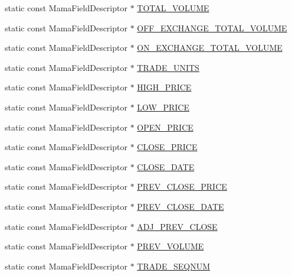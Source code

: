 \begin{CompactItemize}
\item 
static const Mama\-Field\-Descriptor $\ast$ \hyperlink{classWombat_1_1MamdaTradeFields_dccfc4d9e121e80325dc8e348e717c10}{TOTAL\_\-VOLUME}
\item 
static const Mama\-Field\-Descriptor $\ast$ \hyperlink{classWombat_1_1MamdaTradeFields_aea6105e2943749ac8bdd0f9b32dfb3e}{OFF\_\-EXCHANGE\_\-TOTAL\_\-VOLUME}
\item 
static const Mama\-Field\-Descriptor $\ast$ \hyperlink{classWombat_1_1MamdaTradeFields_02d88960945dd4ddcd80129a4d5712d7}{ON\_\-EXCHANGE\_\-TOTAL\_\-VOLUME}
\item 
static const Mama\-Field\-Descriptor $\ast$ \hyperlink{classWombat_1_1MamdaTradeFields_6bc190d6110f6d474dabc2724d71fa5f}{TRADE\_\-UNITS}
\item 
static const Mama\-Field\-Descriptor $\ast$ \hyperlink{classWombat_1_1MamdaTradeFields_1f32883b2a1311abfc0450c6a40eb17b}{HIGH\_\-PRICE}
\item 
static const Mama\-Field\-Descriptor $\ast$ \hyperlink{classWombat_1_1MamdaTradeFields_0fea1065d1953418df3d2cf25e44b51b}{LOW\_\-PRICE}
\item 
static const Mama\-Field\-Descriptor $\ast$ \hyperlink{classWombat_1_1MamdaTradeFields_e8e593c8043ff2fe4d961bdf6fbe0723}{OPEN\_\-PRICE}
\item 
static const Mama\-Field\-Descriptor $\ast$ \hyperlink{classWombat_1_1MamdaTradeFields_dd92da5a4c7e6dc3c5e270a9ed66fd4b}{CLOSE\_\-PRICE}
\item 
static const Mama\-Field\-Descriptor $\ast$ \hyperlink{classWombat_1_1MamdaTradeFields_c6073def88685c23e719fd1b33d5a989}{CLOSE\_\-DATE}
\item 
static const Mama\-Field\-Descriptor $\ast$ \hyperlink{classWombat_1_1MamdaTradeFields_4c455ddb9954226594f316c1c5f8052b}{PREV\_\-CLOSE\_\-PRICE}
\item 
static const Mama\-Field\-Descriptor $\ast$ \hyperlink{classWombat_1_1MamdaTradeFields_e6fab4db03cda1a04978ce52f60b2f8f}{PREV\_\-CLOSE\_\-DATE}
\item 
static const Mama\-Field\-Descriptor $\ast$ \hyperlink{classWombat_1_1MamdaTradeFields_db201de137fa76ebb43aaf3102b71af9}{ADJ\_\-PREV\_\-CLOSE}
\item 
static const Mama\-Field\-Descriptor $\ast$ \hyperlink{classWombat_1_1MamdaTradeFields_bf7a96f80cfac70b232f81be8c339b19}{PREV\_\-VOLUME}
\item 
static const Mama\-Field\-Descriptor $\ast$ \hyperlink{classWombat_1_1MamdaTradeFields_ce7528ed223ca335d3930e71c45c4b99}{TRADE\_\-SEQNUM}

\end{CompactItemize}
